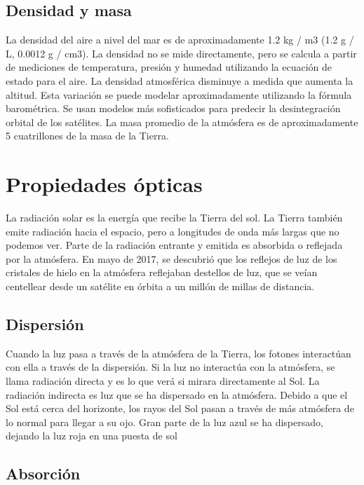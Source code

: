 \documentclass{article} %
\begin{document}
\subsection{Densidad y masa}

La densidad del aire a nivel del mar es de aproximadamente 1.2 kg / m3 (1.2 g / L, 0.0012 g / cm3). La densidad no se mide directamente, pero se calcula a partir de mediciones de temperatura, presión y humedad utilizando la ecuación de estado para el aire. La densidad atmosférica disminuye a medida que aumenta la altitud. Esta variación se puede modelar aproximadamente utilizando la fórmula barométrica. Se usan modelos más sofisticados para predecir la desintegración orbital de los satélites. La masa promedio de la atmósfera es de aproximadamente 5 cuatrillones de la masa de la Tierra.


\section{Propiedades ópticas}

La radiación solar es la energía que recibe la Tierra del sol. La Tierra también emite radiación hacia el espacio, pero a longitudes de onda más largas que no podemos ver. Parte de la radiación entrante y emitida es absorbida o reflejada por la atmósfera. En mayo de 2017, se descubrió que los reflejos de luz de los cristales de hielo en la atmósfera reflejaban destellos de luz, que se veían centellear desde un satélite en órbita a un millón de millas de distancia.


\subsection{Dispersión}

Cuando la luz pasa a través de la atmósfera de la Tierra, los fotones interactúan con ella a través de la dispersión. Si la luz no interactúa con la atmósfera, se llama radiación directa y es lo que verá si mirara directamente al Sol. La radiación indirecta es luz que se ha dispersado en la atmósfera. Debido a que el Sol está cerca del horizonte, los rayos del Sol pasan a través de más atmósfera de lo normal para llegar a su ojo. Gran parte de la luz azul se ha dispersado, dejando la luz roja en una puesta de sol


\subsection{Absorción}
\end{document}

